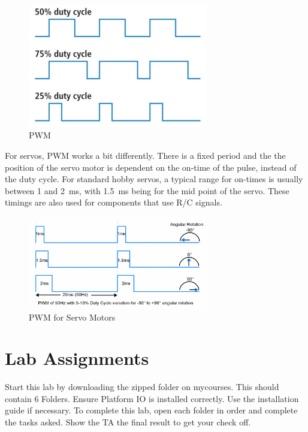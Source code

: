 \documentclass[12pt]{article}
\begin{document}
\begin{figure}[h]
    \centering
    \includegraphics[width=0.7\textwidth]{PWM.png}
    \caption{PWM}
    \label{fig:PWM}
\end{figure}

For servos, PWM works a bit differently. There is a fixed period and the the position of the servo motor is dependent on the on-time of the pulse, instead of the duty cycle. For standard hobby servos, a typical range for on-times is usually between 1 and \SI{2}{\milli\second}, with \SI{1.5}{\milli\second} being for the mid point of the servo. These timings are also used for components that use R/C signals.

\begin{figure}[h]
    \centering
    \includegraphics[width=0.7\textwidth]{Servo_PWM_Duty_Cycle.png}
    \caption{PWM for Servo Motors}
    \label{fig:Servo_PWM}
\end{figure}

\clearpage
\section{Lab Assignments}

Start this lab by downloading the zipped folder on mycourses. This should contain 6 Folders. Ensure Platform IO is installed correctly. Use the installation guide if necessary. To complete this lab, open each folder in order and complete the tasks asked. Show the TA the final result to get your check off. 
\end{document}
